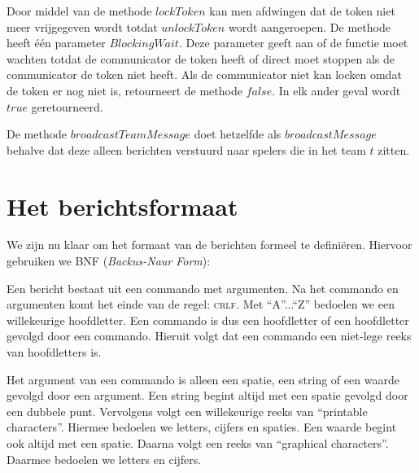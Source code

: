 \documentclass[a4paper,11pt]{article}
\begin{document}
Door middel van de methode $lockToken$ kan men afdwingen dat de token niet meer vrijgegeven wordt totdat $unlockToken$ wordt aangeroepen. De methode heeft \'e\'en parameter $BlockingWait$. Deze parameter geeft aan of de functie moet wachten totdat de communicator de token heeft of direct moet stoppen als de communicator de token niet heeft. Als de communicator niet kan locken omdat de token er nog niet is, retourneert de methode $false$. In elk ander geval wordt $true$ geretourneerd.

De methode $broadcastTeamMessage$ doet hetzelfde als $broadcastMessage$ behalve dat deze alleen berichten verstuurd naar spelers die in het team $t$ zitten.

    \section{Het berichtsformaat}
    \label{sec:protocol}
    We zijn nu klaar om het formaat van de berichten formeel te defini\"eren. Hiervoor gebruiken we BNF (\emph{Backus-Naur Form}):
	
	\begin{center} \end{center}

    Een bericht bestaat uit een commando met argumenten. Na het commando en argumenten komt het einde van de regel: \textsc{crlf}. Met ``A''...``Z'' bedoelen we een willekeurige hoofdletter. Een commando is dus een hoofdletter of een hoofdletter gevolgd door een commando. Hieruit volgt dat een commando een niet-lege reeks van hoofdletters is.

    Het argument van een commando is alleen een spatie, een string of een waarde gevolgd door een argument. Een string begint altijd met een spatie gevolgd door een dubbele punt. Vervolgens volgt een willekeurige reeks van ``printable characters''. Hiermee bedoelen we letters, cijfers en spaties. Een waarde begint ook altijd met een spatie. Daarna volgt een reeks van ``graphical characters''. Daarmee bedoelen we letters en cijfers.
\end{document}
